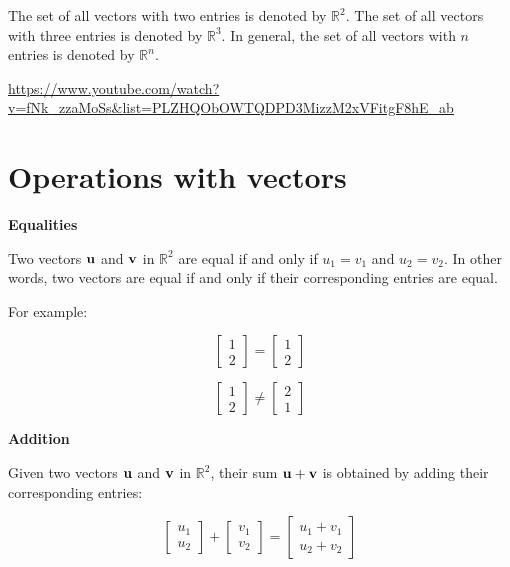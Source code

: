\documentclass[
  letterpaper,
  DIV=11,
  numbers=noendperiod]{scrreprt}
\begin{document}
The set of all vectors with two entries is denoted by \(\mathbb{R}^2\).
The set of all vectors with three entries is denoted by
\(\mathbb{R}^3\). In general, the set of all vectors with \(n\) entries
is denoted by \(\mathbb{R}^n\).

\url{https://www.youtube.com/watch?v=fNk_zzaMoSs\&list=PLZHQObOWTQDPD3MizzM2xVFitgF8hE_ab}

\hypertarget{operations-with-vectors}{%
\section*{Operations with vectors}\label{operations-with-vectors}}


\textbf{Equalities}

Two vectors \(\bf{u}\) and \(\bf{v}\) in \(\mathbb{R}^2\) are equal if
and only if \(u_1 = v_1\) and \(u_2 = v_2\). In other words, two vectors
are equal if and only if their corresponding entries are equal.

For example:

\[
\begin{bmatrix}
1 \\
2
\end{bmatrix}
=
\begin{bmatrix}
1 \\
2
\end{bmatrix}
\]

\[
\begin{bmatrix}
1 \\
2
\end{bmatrix}
\neq
\begin{bmatrix}
2 \\
1
\end{bmatrix}
\]

\textbf{Addition}

Given two vectors \(\bf{u}\) and \(\bf{v}\) in \(\mathbb{R}^2\), their
sum \(\bf{u} + \bf{v}\) is obtained by adding their corresponding
entries:

\[
\begin{bmatrix}
u_1 \\
u_2
\end{bmatrix}
+
\begin{bmatrix}
v_1 \\
v_2
\end{bmatrix}
=
\begin{bmatrix}
u_1 + v_1 \\
u_2 + v_2
\end{bmatrix}
\]
\end{document}
